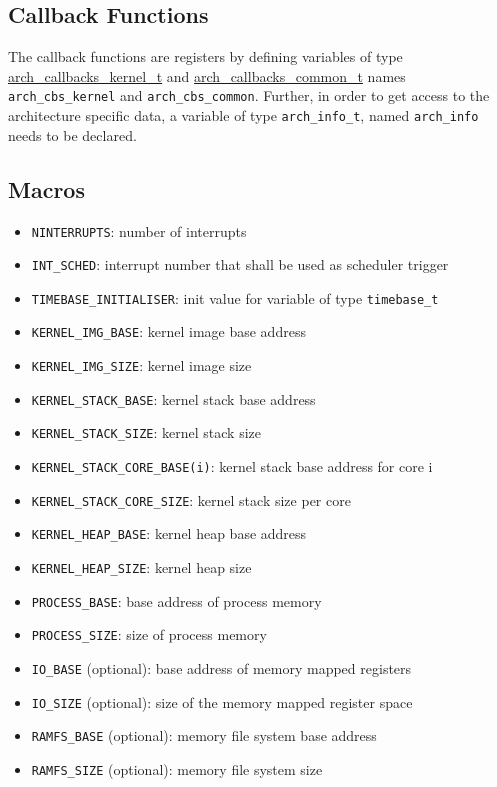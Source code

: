 	\subsection{Callback Functions}
		The callback functions are registers by defining variables of type \hyperref[structarch__callbacks__kernel__t]{arch\_callbacks\_kernel\_t} and \hyperref[structarch__callbacks__common__t]{arch\_callbacks\_common\_t} names \lstinline{arch_cbs_kernel} and \lstinline{arch_cbs_common}. Further, in order to get access to the architecture specific data, a variable of type \lstinline{arch_info_t}, named \lstinline{arch_info} needs to be declared.

	\subsection{Macros}
		\begin{itemize}
			\item \lstinline{NINTERRUPTS}: number of interrupts
			\item \lstinline{INT_SCHED}: interrupt number that shall be used as scheduler trigger\\

			\item \lstinline{TIMEBASE_INITIALISER}: init value for variable of type \lstinline{timebase_t}\\

			\item \lstinline{KERNEL_IMG_BASE}: kernel image base address
			\item \lstinline{KERNEL_IMG_SIZE}: kernel image size
			\item \lstinline{KERNEL_STACK_BASE}: kernel stack base address
			\item \lstinline{KERNEL_STACK_SIZE}: kernel stack size
			\item \lstinline{KERNEL_STACK_CORE_BASE(i)}: kernel stack base address for core i
			\item \lstinline{KERNEL_STACK_CORE_SIZE}: kernel stack size per core
			\item \lstinline{KERNEL_HEAP_BASE}: kernel heap base address
			\item \lstinline{KERNEL_HEAP_SIZE}: kernel heap size\\

			\item \lstinline{PROCESS_BASE}: base address of process memory
			\item \lstinline{PROCESS_SIZE}: size of process memory\\

			\item \lstinline{IO_BASE} (optional): base address of memory mapped registers
			\item \lstinline{IO_SIZE} (optional): size of the memory mapped register space
			\item \lstinline{RAMFS_BASE} (optional): memory file system base address
			\item \lstinline{RAMFS_SIZE} (optional): memory file system size
		\end{itemize}

